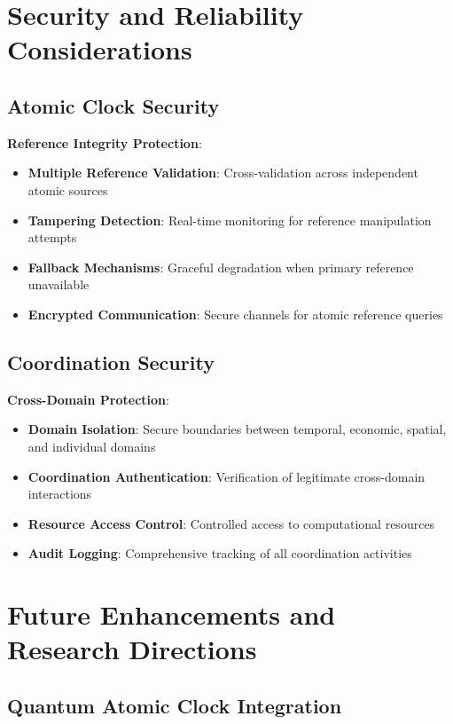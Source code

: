 \documentclass[12pt,a4paper]{article}
\begin{document}
\section{Security and Reliability Considerations}

\subsection{Atomic Clock Security}

\textbf{Reference Integrity Protection}:
\begin{itemize}
\item \textbf{Multiple Reference Validation}: Cross-validation across independent atomic sources
\item \textbf{Tampering Detection}: Real-time monitoring for reference manipulation attempts
\item \textbf{Fallback Mechanisms}: Graceful degradation when primary reference unavailable
\item \textbf{Encrypted Communication}: Secure channels for atomic reference queries
\end{itemize}

\subsection{Coordination Security}

\textbf{Cross-Domain Protection}:
\begin{itemize}
\item \textbf{Domain Isolation}: Secure boundaries between temporal, economic, spatial, and individual domains
\item \textbf{Coordination Authentication}: Verification of legitimate cross-domain interactions
\item \textbf{Resource Access Control}: Controlled access to computational resources
\item \textbf{Audit Logging}: Comprehensive tracking of all coordination activities
\end{itemize}

\section{Future Enhancements and Research Directions}

\subsection{Quantum Atomic Clock Integration}
\end{document}
